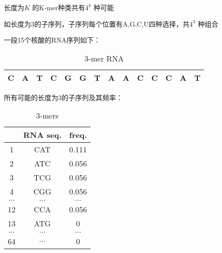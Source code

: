 \begin{eg}
    长度为$K$ 的K-mer种类共有$4^{k}$ 种可能

    如长度为3的子序列，子序列每个位置有A,G,C,U四种选择，共$4^3$ 种组合

    一段15个核酸的RNA序列如下：
    \begin{table}[htpb]
        \centering
        \caption{3-mer RNA}
        \label{tab:3-mer-RNA}
        \begin{tabular}{|c|c|c|c|c|c|c|c|c|c|c|c|c|c|}
        \hline
        C & A & T & C & G & G & T & A & A & C & C & C & A & T \\
        \hline
        \end{tabular}
    \end{table}

    所有可能的长度为3的子序列及其频率：
    \begin{table}[htpb]
        \centering
        \caption{3-mers}
        \label{tab:3-mers}
        \begin{tabular}{ccc}
        \toprule
        & RNA seq. & freq. \\
        \midrule
            1 & CAT & 0.111\\
            2 & ATC & 0.056\\
            3 & TCG & 0.056\\
            4 & CGG & 0.056\\
            $\ldots$ & $\ldots$ & $\ldots$\\
            12 & CCA & 0.056\\
            13 & ATG & 0\\
            $\ldots$ & $\ldots$ & $\ldots$ \\
            64 & $\ldots$ & 0 \\
        \bottomrule
        \end{tabular}
    \end{table}
\end{eg}


